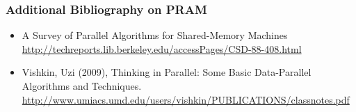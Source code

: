 \documentclass[14pt,aspectratio=169]{beamer}
\begin{document}
\begin{frame}\frametitle{Additional Bibliography on PRAM}

    \begin{itemize}[<.->]
    \item
A Survey of Parallel Algorithms for Shared-Memory Machines
\url{http://techreports.lib.berkeley.edu/accessPages/CSD-88-408.html}
    \item
Vishkin, Uzi (2009), Thinking in Parallel: Some Basic Data-Parallel Algorithms and
Techniques.    
\url{http://www.umiacs.umd.edu/users/vishkin/PUBLICATIONS/classnotes.pdf}    
\end{itemize}
\end{frame}
\end{document}
